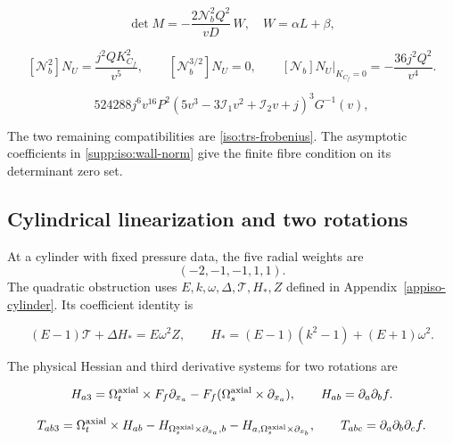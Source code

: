 \begin{equation}\label{supp:iso:trs-wall}
 \det M=-\frac{2\mathcal N_b^2Q^2}{vD}\,W,\quad
 W=\alpha L+\beta,
\end{equation}

\begin{equation}\label{supp:iso:wall-norm}
 [\mathcal N_b^2]N_U=\frac{j^2QK_{C_f}^2}{v^5},\qquad
 [\mathcal N_b^{3/2}]N_U=0,\qquad
 [\mathcal N_b]N_U\big|_{K_{C_f}=0}=-\frac{36j^2Q^2}{v^4}.
\end{equation}

\begin{equation}\label{supp:iso:trs-L-resultant}
 524288j^6v^{16}P^2(5v^3-3\mathcal I_1v^2+\mathcal I_2v+j)^3 G^{-1}(v),
\end{equation}

The two remaining compatibilities are
\eqref{iso:trs-frobenius}. The asymptotic
coefficients in \eqref{supp:iso:wall-norm} give the finite fibre
condition on its determinant zero set.

\subsection{Cylindrical linearization and two rotations}

At a cylinder with fixed pressure data, the five radial weights are
\[
 (-2,-1,-1,1,1).
\]
The quadratic obstruction uses $E,k,\omega,\Delta,\mathscr T,H_*,Z$
defined in Appendix~\ref{appiso-cylinder}. Its coefficient
identity is

\begin{equation}\label{supp:appiso-conic-wall}
 (E-1)\mathscr T+\Delta H_*=E\omega^2Z,\qquad
 H_*=(E-1)(k^2-1)+(E+1)\omega^2.
\end{equation}

The physical Hessian and third derivative systems for two rotations
are

\begin{equation}\label{supp:iso:rr-H}
 H_{a3}=\Omega_t^{\rm axial}\times F_f\partial_{x_a}-F_f(\Omega_s^{\rm axial}\times \partial_{x_a}),\qquad H_{ab}=\partial_a\partial_b f.
\end{equation}

\begin{equation}\label{supp:iso:rr-T}
 T_{ab3}=\Omega_t^{\rm axial}\times H_{ab}-H_{\Omega_s^{\rm axial}\times \partial_{x_a},b}-H_{a,\Omega_s^{\rm axial}\times \partial_{x_b}},
 \qquad T_{abc}=\partial_a\partial_b\partial_c f.
\end{equation}

